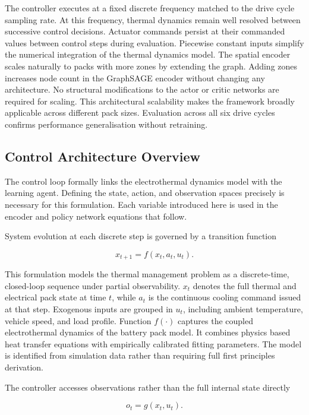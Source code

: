\documentclass[twocolumn]{article}
\begin{document}
The controller executes at a fixed discrete frequency matched to the drive cycle sampling rate. At this frequency, thermal dynamics remain well resolved between successive control decisions. Actuator commands persist at their commanded values between control steps during evaluation. Piecewise constant inputs simplify the numerical integration of the thermal dynamics model. The spatial encoder scales naturally to packs with more zones by extending the graph. Adding zones increases node count in the GraphSAGE encoder without changing any architecture. No structural modifications to the actor or critic networks are required for scaling. This architectural scalability makes the framework broadly applicable across different pack sizes. Evaluation across all six drive cycles confirms performance generalisation without retraining.

\subsection*{Control Architecture Overview}

The control loop formally links the electrothermal dynamics model with the learning agent. Defining the state, action, and observation spaces precisely is necessary for this formulation. Each variable introduced here is used in the encoder and policy network equations that follow.

System evolution at each discrete step is governed by a transition function

\begin{equation}
x_{t+1} = f(x_t, a_t, u_t). \label{eq:transition}
\end{equation}

This formulation models the thermal management problem as a discrete-time, closed-loop sequence under partial observability. $x_t$ denotes the full thermal and electrical pack state at time $t$, while $a_t$ is the continuous cooling command issued at that step. Exogenous inputs are grouped in $u_t$, including ambient temperature, vehicle speed, and load profile. Function $f(\cdot)$ captures the coupled electrothermal dynamics of the battery pack model. It combines physics based heat transfer equations with empirically calibrated fitting parameters. The model is identified from simulation data rather than requiring full first principles derivation.

The controller accesses observations rather than the full internal state directly

\begin{equation}
o_t = g(x_t, u_t). \label{eq:observation}
\end{equation}
\end{document}
